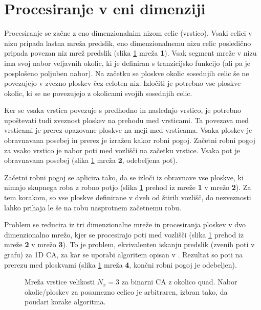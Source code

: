 \documentclass[12pt,a4paper,openany,twoside]{book}
\begin{document}
\section{Procesiranje v eni dimenziji}

Procesiranje se začne z eno dimenzionalnim nizom celic (vrstico).
Vsaki celici v nizu pripada lastna mreža predslik, eno dimenzionalnemu nizu celic
posledično pripada povezan niz mrež predslik (slika \ref{algorithm_line} mreža \textbf{1}).
Vsak segment mreže v nizu ima svoj nabor veljavnih okolic,
ki je definiran s tranzicijsko funkcijo (ali pa je posplošeno poljuben nabor).
Na začetku se ploskve okolic sosednjih celic še ne povezujejo v
zvezno ploskev čez celoten niz. Izločiti je potrebno vse ploskve okolic,
ki se ne povezujejo z okolicami svojih sosednjih celic.

Ker se vsaka vrstica povezuje s predhodno in naslednjo vrstico, je potrebno
upoštevati tudi zveznost ploskev na prehodu med vrsticami.
Ta povezava med vrsticami je prerez opazovane ploskve na meji med vrsticama.
Vsaka ploskev je obravnavana posebej in prerez je izražen kakor robni pogoj.
Začetni robni pogoj za vsako vrstico je nabor poti med vozlišči na začetku vrstice.
Vsaka pot je obravnavana posebej (slika \ref{algorithm_line} mreža \textbf{2}, odebeljena pot).

Začetni robni pogoj se aplicira tako, da se izloči iz obravnave vse ploskve,
ki nimajo skupnega roba z robno potjo (slika \ref{algorithm_line}
prehod iz mreže \textbf{1} v mrežo \textbf{2}). Za tem korakom, so vse ploskve definirane
v dveh od štirih vozlišč, do nezveznosti lahko prihaja le še na robu nasprotnem
začetnemu robu.

Problem se reducira iz tri dimenzionalne mreže in procesiranja ploskev v
dvo dimenzionalno mrežo, kjer se procesirajo poti med vozlišči (slika \ref{algorithm_line}
prehod iz mreže \textbf{2} v mrežo \textbf{3}). To je problem, ekvivalenten iskanju predslik
(zvenih poti v grafu) za 1D CA, za kar se uporabi algoritem opisan v \cite{JerasDobnikar2007}.
Rezultat so poti na prerezu med ploskvami (slika \ref{algorithm_line} mreža \textbf{4},
končni robni pogoj je odebeljen).

\begin{figure}[htb]
\centerline{}
\caption[Algoritem procesiranja vrstice.]{Mreža vrstice velikosti \(N_x=3\) za binarni CA z okolico quad.
Nabor okolic/ploskev za posamezno celico je arbitraren, izbran tako, da poudari korake algoritma.}
\label{algorithm_line}
\end{figure}
\end{document}
